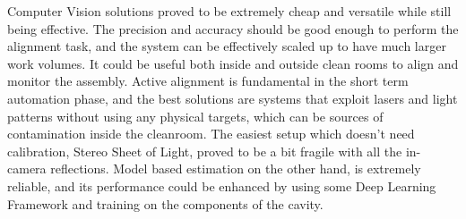 \documentclass[12pt,a4paper]{article}
\begin{document}
\newline

\newline
Computer Vision solutions proved to be extremely cheap and versatile while still being effective. The precision and accuracy should be good enough to perform the alignment task, and the system can be effectively scaled up to have much larger work volumes. It could be useful both inside and outside clean rooms to align and monitor the assembly. Active alignment is fundamental in the short term automation phase, and the best solutions are systems that exploit lasers and light patterns without using any physical targets, which can be sources of contamination inside the cleanroom. The easiest setup which doesn't need calibration, Stereo Sheet of Light, proved to be a bit fragile with all the in-camera reflections. Model based estimation on the other hand, is extremely reliable, and its performance could be enhanced by using some Deep Learning Framework and training on the components of the cavity.







\clearpage
\newpage






\end{document}
